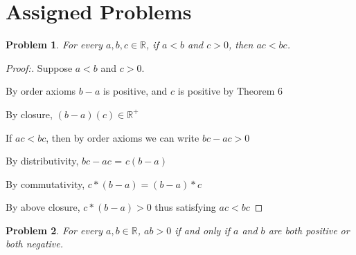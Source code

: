 \documentclass[12pt]{article}
\newtheorem{theorem}{Problem}[section]
\begin{document}
\section{Assigned Problems}

\begin{theorem}
    For every $a, b, c \in \mathbb{R}$, if $a < b$ and $c > 0$, then $ac < bc$.
\end{theorem}

\begin{proof}[Proof:]
    Suppose $a < b$ and $c > 0$.

    By order axioms $b - a$ is positive, and $c$ is positive by Theorem 6

    By closure, $(b-a)(c) \in \mathbb{R^+}$

    If $ac < bc$, then by order axioms we can write $bc - ac > 0$
    
    By distributivity, $bc - ac$ = $c(b-a)$

    By commutativity, $c * (b-a) = (b-a) * c$

    By above closure, $c * (b-a) > 0$ thus satisfying $ac < bc$




    
\end{proof}

\newpage

\begin{theorem}
For every $a, b \in \mathbb{R}$, $ab > 0$ if and only if $a$ and $b$ are both positive or both negative.
\end{theorem}
\end{document}
